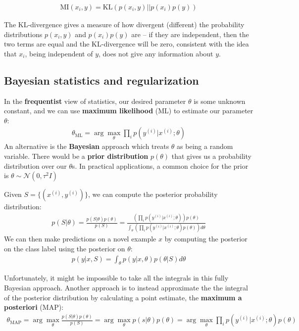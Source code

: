 \documentclass[letterpaper,10pt]{article}
\begin{document}
\begin{align}
\text{MI}(x_i,y) = \text{KL}(p(x_i,y)||p(x_i)p(y))
\end{align}

The KL-divergence gives a measure of how divergent (different) the probability distributions $p(x_i,y)$ and $p(x_i)p(y)$ are -- if they are independent, then the two terms are equal and the KL-divergence will be zero, consistent with the idea that $x_i$, being independent of $y$, does not give any information about $y$.

\subsection{Bayesian statistics and regularization}

In the \textbf{frequentist} view of statistics, our desired parameter $\theta$ is some unknown constant, and we can use \textbf{maximum likelihood} (ML) to estimate our parameter $\theta$:
\begin{align}
\theta_\text{ML} = \arg \max_\theta \prod_i p(y^{(i)}|x^{(i)};\theta)
\end{align}
An alternative is the \textbf{Bayesian} approach which treats $\theta$ as being a random variable. There would be a \textbf{prior distribution} $p(\theta)$ that gives us a probability distribution over our $\theta$s. In practical applications, a common choice for the prior is $\theta \sim \mathscr{N}(0,\tau^2 I)$

Given $S=\{(x^{(i)},y^{(i)})\}$, we can compute the posterior probability distribution:
\begin{align}
p(S|\theta) = \frac{p(S|\theta)p(\theta)}{p(S)} = \frac{(\prod_i p(y^{(i)}|x^{(i)};\theta)) p(\theta)}{\int_\theta (\prod_i p(y^{(i)}|x^{(i)};\theta) p(\theta)) d\theta}
\end{align}
We can then make predictions on a novel example $x$ by computing the posterior on the class label using the posterior on $\theta$:
\begin{align}
p(y|x,S) = \int_\theta p(y|x,\theta) p(\theta|S) d\theta
\end{align}

Unfortunately, it might be impossible to take all the integrals in this fully Bayesian approach. Another approach is to instead approximate the the integral of the posterior distribution by calculating a point estimate, the \textbf{maximum a posteriori} (MAP): 
\begin{align}
\theta_\text{MAP} = \arg\max_\theta \frac{p(S|\theta)p(\theta)}{p(S)} = \arg\max_\theta p(s|\theta)p(\theta) = \arg\max_\theta \prod_i p(y^{(i)}|x^{(i)};\theta) p(\theta)
\end{align}
\end{document}
